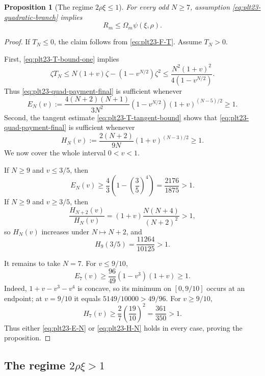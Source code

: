 \documentclass[11pt]{article}
\newtheorem{proposition}[theorem]{Proposition}
\numberwithin{equation}{section}
\begin{document}
\begin{proposition}[The regime $2\rho\xi\le1$]\label{prop:plt23-quadratic-branch}
  For every odd $N\ge7$, assumption \eqref{eq:plt23-quadratic-branch} implies
  \[
    R_m\le \Omega_m\psi(\xi,\rho).
  \]
\end{proposition}

\begin{proof}
  If $T_N\le0$, the claim follows from \eqref{eq:plt23-F-T}.
  Assume $T_N>0$.

  First, \eqref{eq:plt23-T-bound-one} implies
  \[
    \zeta T_N
    \le N(1+v)\zeta-(1-v^{N/2})\zeta^2
    \le\frac{N^2(1+v)^2}{4(1-v^{N/2})}.
  \]
  Thus \eqref{eq:plt23-quad-payment-final} is sufficient whenever
  \begin{equation}\label{eq:plt23-E-N}
    E_N(v):=
    \frac{4(N+2)(N+1)}{3N^2}
    (1-v^{N/2})(1+v)^{(N-5)/2}\ge1.
  \end{equation}
  Second, the tangent estimate \eqref{eq:plt23-T-tangent-bound} shows that \eqref{eq:plt23-quad-payment-final} is sufficient whenever
  \begin{equation}\label{eq:plt23-H-N}
    H_N(v):=
    \frac{2(N+2)}{9N}(1+v)^{(N-3)/2}\ge1.
  \end{equation}
  We now cover the whole interval $0<v<1$.

  If $N\ge9$ and $v\le3/5$, then
  \[
    E_N(v)\ge\frac{4}{3}\left(1-\left(\frac{3}{5}\right)^4\right)
    =\frac{2176}{1875}>1.
  \]
  If $N\ge9$ and $v\ge3/5$, then
  \[
    \frac{H_{N+2}(v)}{H_N(v)}
    =(1+v)\frac{N(N+4)}{(N+2)^2}>1,
  \]
  so $H_N(v)$ increases under $N\mapsto N+2$, and
  \[
    H_9(3/5)=\frac{11264}{10125}>1.
  \]

  It remains to take $N=7$.
  For $v\le9/10$,
  \[
    E_7(v)\ge\frac{96}{49}(1-v^3)(1+v)\ge1.
  \]
  Indeed, $1+v-v^3-v^4$ is concave, so its minimum on $[0,9/10]$ occurs at an endpoint; at $v=9/10$ it equals $5149/10000>49/96$.
  For $v\ge9/10$,
  \[
    H_7(v)\ge\frac{2}{7}\left(\frac{19}{10}\right)^2
    =\frac{361}{350}>1.
  \]
  Thus either \eqref{eq:plt23-E-N} or \eqref{eq:plt23-H-N} holds in every case, proving the proposition.
\end{proof}

\subsection{The regime \texorpdfstring{$2\rho\xi>1$}{2 rho xi > 1}}\label{subsec:plt23-linear}
\end{document}

